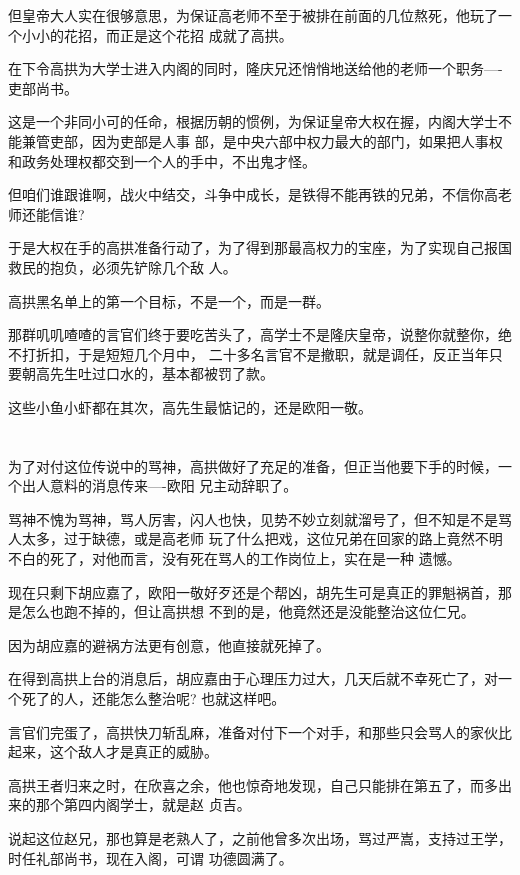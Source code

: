 \documentclass[11pt,a4paper,onecolumn]{article}
\begin{document}
但皇帝大人实在很够意思，为保证高老师不至于被排在前面的几位熬死，他玩了一个小小的花招，而正是这个花招
成就了高拱。

在下令高拱为大学士进入内阁的同时，隆庆兄还悄悄地送给他的老师一个职务----吏部尚书。

这是一个非同小可的任命，根据历朝的惯例，为保证皇帝大权在握，内阁大学士不能兼管吏部，因为吏部是人事
部，是中央六部中权力最大的部门，如果把人事权和政务处理权都交到一个人的手中，不出鬼才怪。

但咱们谁跟谁啊，战火中结交，斗争中成长，是铁得不能再铁的兄弟，不信你高老师还能信谁?

于是大权在手的高拱准备行动了，为了得到那最高权力的宝座，为了实现自己报国救民的抱负，必须先铲除几个敌
人。

高拱黑名单上的第一个目标，不是一个，而是一群。

那群叽叽喳喳的言官们终于要吃苦头了，高学士不是隆庆皇帝，说整你就整你，绝不打折扣，于是短短几个月中，
二十多名言官不是撤职，就是调任，反正当年只要朝高先生吐过口水的，基本都被罚了款。

这些小鱼小虾都在其次，高先生最惦记的，还是欧阳一敬。

\section[\thesection]{}

为了对付这位传说中的骂神，高拱做好了充足的准备，但正当他要下手的时候，一个出人意料的消息传来----欧阳
兄主动辞职了。

骂神不愧为骂神，骂人厉害，闪人也快，见势不妙立刻就溜号了，但不知是不是骂人太多，过于缺德，或是高老师
玩了什么把戏，这位兄弟在回家的路上竟然不明不白的死了，对他而言，没有死在骂人的工作岗位上，实在是一种
遗憾。

现在只剩下胡应嘉了，欧阳一敬好歹还是个帮凶，胡先生可是真正的罪魁祸首，那是怎么也跑不掉的，但让高拱想
不到的是，他竟然还是没能整治这位仁兄。

因为胡应嘉的避祸方法更有创意，他直接就死掉了。

在得到高拱上台的消息后，胡应嘉由于心理压力过大，几天后就不幸死亡了，对一个死了的人，还能怎么整治呢?
也就这样吧。

言官们完蛋了，高拱快刀斩乱麻，准备对付下一个对手，和那些只会骂人的家伙比起来，这个敌人才是真正的威胁。

高拱王者归来之时，在欣喜之余，他也惊奇地发现，自己只能排在第五了，而多出来的那个第四内阁学士，就是赵
贞吉。

说起这位赵兄，那也算是老熟人了，之前他曾多次出场，骂过严嵩，支持过王学，时任礼部尚书，现在入阁，可谓
功德圆满了。
\end{document}
